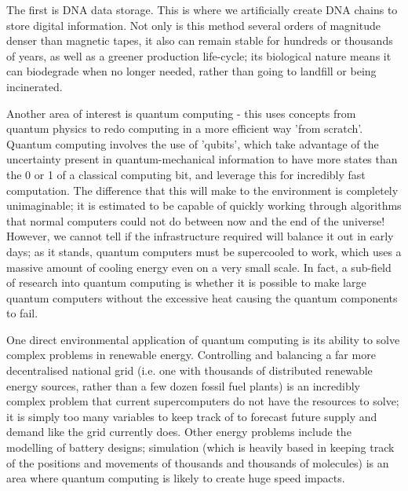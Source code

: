 \documentclass{article}
\begin{document}
The first is DNA data storage. This is where we artificially create DNA chains to store digital information. Not only is this method several orders of magnitude denser than magnetic tapes, it also can remain stable for hundreds or thousands of years, as well as a greener production life-cycle; its biological nature means it can biodegrade when no longer needed, rather than going to landfill or being incinerated. \citep{nguyen2020architecting}\newline

Another area of interest is quantum computing - this uses concepts from quantum physics to redo computing in a more efficient way 'from scratch'. Quantum computing involves the use of 'qubits', which take advantage of the uncertainty present in quantum-mechanical information to have more states than the 0 or 1 of a classical computing bit, and leverage this for incredibly fast computation. \citep{national2019quantum} The difference that this will make to the environment is completely unimaginable; it is estimated to be capable of quickly working through algorithms that normal computers could not do between now and the end of the universe! \citep{gyongyosi2019survey} However, we cannot tell if the infrastructure required will balance it out in early days; as it stands, quantum computers must be supercooled to work, which uses a massive amount of cooling energy even on a very small scale. In fact, a sub-field of research into quantum computing is whether it is possible to make large quantum computers without the excessive heat causing the quantum components to fail. \citep{ikonen2017energy}\newline

One direct environmental application of quantum computing is its ability to solve complex problems in renewable energy. Controlling and balancing a far more decentralised national grid (i.e. one with thousands of distributed renewable energy sources, rather than a few dozen fossil fuel plants) is an incredibly complex problem that current supercomputers do not have the resources to solve; it is simply too many variables to keep track of to forecast future supply and demand like the grid currently does. Other energy problems include the modelling of battery designs; simulation (which is heavily based in keeping track of the positions and movements of thousands and thousands of molecules) is an area where quantum computing is likely to create huge speed impacts. \citep{giani2021quantum}
\end{document}
